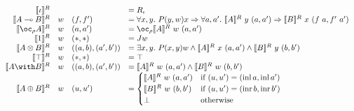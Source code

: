 \begin{displaymath}
  \begin{array}{rlll}
    \sem{\base}^R && &= R_\base \\
    \sem{\fun{A}{B}}^R & w & (f,f') &= \forall x,y.~P(y,w)x \Rightarrow \forall
    a,a'.~\sem{A}^R~y~(a,a') \Rightarrow \sem{B}^R~x~(f~a,f'~a') \\
    \sem{\excl{\rho}{A}}^R & w & (a,a') &= \oc_\rho \sem{A}^R~w~(a,a') \\
    \sem{\tensorOne}^R & w & (*,*) &= Jw \\
    \sem{\tensor{A}{B}}^R & w & ((a,b),(a',b')) &= \exists x,y.~P(x,y)w \wedge
    \sem{A}^R~x~(a,a') \wedge \sem{B}^R~y~(b,b') \\
    \sem{\withTOne}^R & w & (*,*) &= \top \\
    \sem{\withT{A}{B}}^R & w & ((a,b),(a',b')) &=
    \sem{A}^R~w~(a,a') \wedge \sem{B}^R~w~(b,b') \\
    \sem{\sumT{A}{B}}^R & w & (u,u') &=
    \begin{cases}
      \sem{A}^R~w~(a,a') & \text{if } (u,u') = (\operatorname{inl} a,
                           \operatorname{inl} a') \\
      \sem{B}^R~w~(b,b') & \text{if } (u,u') = (\operatorname{inr} b,
                           \operatorname{inr} b') \\
      \bot & \text{otherwise}
    \end{cases}
  \end{array}
\end{displaymath}